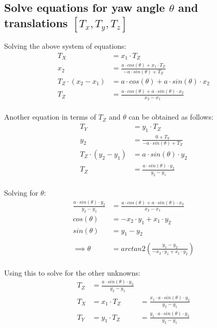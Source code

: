 \documentclass[12pt, oneside]{article}
\begin{document}
\subsection{Solve equations for yaw angle $\theta$ and translations 
$[T_x, T_y, T_z]$}

Solving the above system of equations:
\begin{align*}
T_X &= x_1 \cdot {T_Z}  \\
x_2 &= \frac{a \cdot cos(\theta) + x_1 \cdot {T_Z}}{-a \cdot sin(\theta) + T_Z} \\
T_Z \cdot (x_2 - x_1) &= a \cdot cos(\theta) + a \cdot sin(\theta) \cdot x_2 \\
T_Z &= \frac{a \cdot cos(\theta) + a \cdot sin(\theta) \cdot x_2}{x_2 - x_1} \\
\end{align*}

Another equation in terms of $T_Z$ and $\theta$ can be obtained as follows:
\begin{align*}
T_Y &= y_1 \cdot {T_Z}  \\
y_2 &= \frac{0 + T_Y}{-a \cdot sin(\theta) + T_Z} \\
T_Z \cdot (y_2 - y_1) &= a \cdot sin(\theta) \cdot y_2 \\
T_Z &= \frac{a \cdot sin(\theta) \cdot y_2}{y_2 - y_1} \\
\end{align*}

Solving for $\theta$:
\begin{align*}
\frac{a \cdot sin(\theta) \cdot y_2}{y_2 - y_1}
&= \frac{a \cdot cos(\theta) + a \cdot sin(\theta) \cdot x_2}{x_2 - x_1} \\
cos(\theta) &= -x_2 \cdot y_1 + x_1 \cdot y_2 \\
sin(\theta) &= y_1 - y_2  \\ \\
\implies \theta &= arctan2 \left( 
    \frac{y_1 - y_2}{-x_2 \cdot y_1 + x_1 \cdot y_2}
    \right) \\
\end{align*}

Using this to solve for the other unknowns:
\begin{align*}
    T_Z &= \frac{a \cdot sin(\theta) \cdot y_2}{y_2 - y_1} \\
    T_X &= x_1 \cdot {T_Z}  
        &= \frac{x_1 \cdot a \cdot sin(\theta) \cdot y_2}{y_2 - y_1} \\
    T_Y &= y_1 \cdot {T_Z}  
        &= \frac{y_1 \cdot a \cdot sin(\theta) \cdot y_2}{y_2 - y_1}\\
\end{align*}
\end{document}
